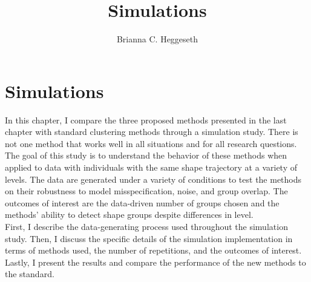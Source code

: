 \documentclass[12pt]{article}
\title{Simulations}
\author{Brianna C. Heggeseth}
\begin{document}
\maketitle
\section{Simulations}
In this chapter, I compare the three proposed methods presented in the last chapter with standard clustering methods through a simulation study. There is not one method that works well in all situations and for all research questions. The goal of this study is to understand the behavior of these methods when applied to data with individuals with the same shape trajectory at a variety of levels. The data are generated under a variety of conditions to test the methods on their robustness to model misspecification, noise, and group overlap. The outcomes of interest are the data-driven number of groups chosen and the methods' ability to detect shape groups despite differences in level. \\

First, I describe the data-generating process used throughout the simulation study. Then, I discuss the specific details of the simulation implementation in terms of methods used, the number of repetitions, and the outcomes of interest. Lastly, I present the results and compare the performance of the new methods to the standard.
\end{document}
